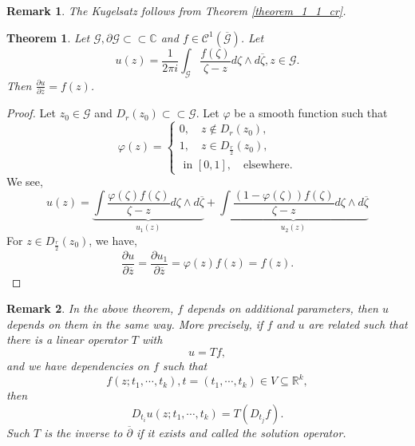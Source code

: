 \documentclass{article}
\newtheorem{theorem}{Theorem} [section]
\newtheorem{remark}{Remark}[section]
\newcommand{\R}[0]{\mathbb{R}}
\newcommand{\C}[0]{\mathbb{C}}
\newcommand{\G}[0]{\mathcal{G}}
\newcommand{\pd}[2]{{\frac {\partial#1} {\partial#2}}}
\newcommand{\bd}[0]{\partial}
\newcommand{\compembed}[0]{\subset\subset}
\begin{document}
\begin{remark}
  The Kugelsatz follows from Theorem \ref{theorem_1_1_cr}.
\end{remark}

\begin{theorem}
 Let $\G,\bd\G\compembed\C$ and $f\in\mathcal{C}^1(\overline{\G})$. Let
 \begin{equation*}
  u(z) = {\frac 1 {2\pi i}}\int_\G {\frac {f(\zeta)} {\zeta-z}}d\zeta\wedge d\overline{\zeta},z\in\G.
 \end{equation*}
 Then $\pd{u}{\overline{z}} = f(z)$. 
 \label{theorem_1_2_cr}
\end{theorem}

\begin{proof}
  Let $z_0\in\G$ and $D_r(z_0)\compembed\G$. Let $\varphi$ be a smooth function such that 
  \begin{equation*}
  \varphi(z) = \begin{cases}
    0, \quad z\not\in D_r(z_0),\\
    1, \quad z\in D_{{\frac r 2}}(z_0),\\
    \text{ in }[0,1],\quad \text{elsewhere}.
  \end{cases}
  \end{equation*}
  We see,
  \begin{equation*}
    u(z) = \underbrace{\int{\frac {\varphi(\zeta)f(\zeta)} {\zeta-z}}d\zeta\wedge d\overline{\zeta}}_{u_1(z)}+\underbrace{\int{\frac {(1-\varphi(\zeta))f(\zeta)} {\zeta-z}}d\zeta\wedge d\overline{\zeta}}_{u_2(z)}
  \end{equation*}
  For $z\in D_{{\frac r 2}}(z_0)$, we have,
  \begin{equation*}
    \pd{u}{\overline{z}} = \pd{u_1}{\overline{z}} = \varphi(z)f(z) = f(z).
  \end{equation*}
\end{proof}

\begin{remark}
  In the above theorem, $f$ depends on additional parameters, then $u$ depends on them in the same way. More precisely, if $f$ and $u$ are related such that there is a linear operator $T$ with 
  \begin{equation*}
    u = Tf,
  \end{equation*}
  and we have dependencies on $f$ such that 
  \begin{equation*}
    f(z;t_1,\cdots,t_k), t = (t_1,\cdots,t_k)\in V\subseteq\R^k,
  \end{equation*}
  then 
  \begin{equation*}
    D_{t_i}u(z;t_1,\cdots,t_k) = T(D_{t_j}f).
  \end{equation*}
  Such $T$ is the inverse to $\overline{\partial}$ if it exists and called the solution operator.
\end{remark}
\end{document}
